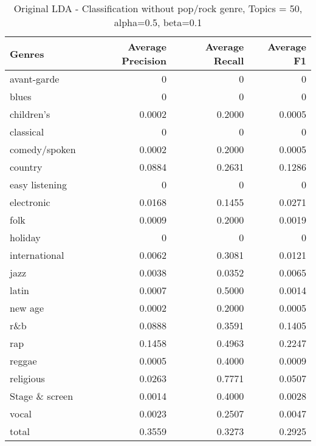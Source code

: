 \begin{table}[h!]
\begin{tabular}{|l|r|r|r|}

\hline
\textbf{Genres} &  \textbf{Average Precision} & \textbf{Average Recall} & \textbf{Average F1} \\
\hline
avant-garde & 0	& 0& 	0\\
blues & 0	& 0	& 0\\
children's& 0.0002	& 0.2000	& 0.0005\\
classical& 0	& 0	& 0\\
comedy/spoken& 0.0002	& 0.2000	& 0.0005\\
country& 0.0884& 	0.2631	& 0.1286\\
easy listening& 0	& 0	& 0\\
electronic& 0.0168	& 0.1455	& 0.0271\\
folk& 0.0009	& 0.2000	& 0.0019\\
holiday& 0& 	0& 	0\\
international& 0.0062	& 0.3081& 	0.0121\\
jazz& 0.0038	& 0.0352& 	0.0065\\
latin& 0.0007	& 0.5000& 	0.0014\\
new age& 0.0002& 	0.2000	& 0.0005\\
r\&b& 0.0888	& 0.3591	& 0.1405\\
rap& 0.1458	& 0.4963	& 0.2247\\
reggae& 0.0005& 	0.4000	& 0.0009\\
religious& 0.0263	& 0.7771	& 0.0507\\
Stage \& screen& 0.0014& 	0.4000	& 0.0028\\
vocal& 0.0023	& 0.2507	& 0.0047\\
total& 0.3559	& 0.3273	& 0.2925\\
\hline
\end{tabular}
\caption{Original LDA - Classification without pop/rock genre, Topics = 50, alpha=0.5, beta=0.1}
\end{table}